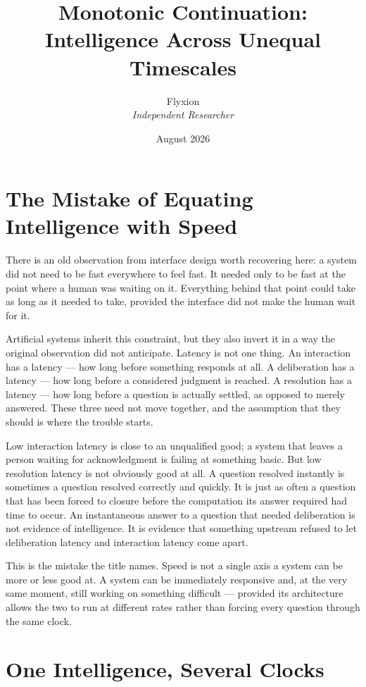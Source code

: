 \documentclass[11pt]{article}
\title{\textbf{Monotonic Continuation: Intelligence Across Unequal Timescales}}
\author{Flyxion \\ \textit{Independent Researcher}}
\date{August 2026}
\begin{document}
\maketitle

\section{The Mistake of Equating Intelligence with Speed}

There is an old observation from interface design worth recovering here: a system did not need to be fast everywhere to feel fast. It needed only to be fast at the point where a human was waiting on it. Everything behind that point could take as long as it needed to take, provided the interface did not make the human wait for it.

Artificial systems inherit this constraint, but they also invert it in a way the original observation did not anticipate. Latency is not one thing. An interaction has a latency --- how long before something responds at all. A deliberation has a latency --- how long before a considered judgment is reached. A resolution has a latency --- how long before a question is actually settled, as opposed to merely answered. These three need not move together, and the assumption that they should is where the trouble starts.

Low interaction latency is close to an unqualified good; a system that leaves a person waiting for acknowledgment is failing at something basic. But low resolution latency is not obviously good at all. A question resolved instantly is sometimes a question resolved correctly and quickly. It is just as often a question that has been forced to closure before the computation its answer required had time to occur. An instantaneous answer to a question that needed deliberation is not evidence of intelligence. It is evidence that something upstream refused to let deliberation latency and interaction latency come apart.

This is the mistake the title names. Speed is not a single axis a system can be more or less good at. A system can be immediately responsive and, at the very same moment, still working on something difficult --- provided its architecture allows the two to run at different rates rather than forcing every question through the same clock.

\section{One Intelligence, Several Clocks}
\end{document}
